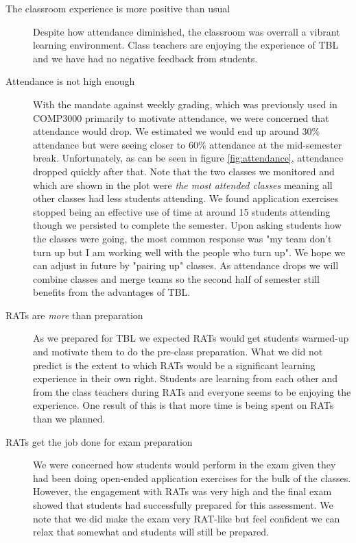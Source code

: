 \documentclass[twoside=false,DIV=14]{scrartcl}
\begin{document}
\begin{description}
\item[The classroom experience is more positive than usual] Despite how attendance diminished, the classroom was overrall a vibrant learning environment.  Class teachers are enjoying the experience of TBL and we have had no negative feedback from students.
\item[Attendance is not high enough]  With the mandate against weekly grading, which was previously used in COMP3000 primarily to motivate attendance, we were concerned that attendance would drop.  We estimated we would end up around 30\% attendance but were seeing closer to 60\% attendance at the mid-semester break. Unfortunately, as can be seen in figure \ref{fig:attendance}, attendance dropped quickly after that.  Note that the two classes we monitored and which are shown in the plot were \emph{the most attended classes} meaning all other classes had less students attending.  We found application exercises stopped being an effective use of time at around 15 students attending though we persisted to complete the semester.  Upon asking students how the classes were going, the most common response was "my team don't turn up but I am working well with the people who turn up".  We hope we can adjust in future by "pairing up" classes.  As attendance drops we will combine classes and merge teams so the second half of semester still benefits from the advantages of TBL.
\item[RATs are \emph{more} than preparation]  As we prepared for TBL we expected RATs would get students warmed-up and motivate them to do the pre-class preparation.  What we did not predict is the extent to which RATs would be a significant learning experience in their own right.  Students are learning from each other and from the class teachers during RATs and everyone seems to be enjoying the experience.  One result of this is that more time is being spent on RATs than we planned.
\item[RATs get the job done for exam preparation] We were concerned how students would perform in the exam given they had been doing open-ended application exercises for the bulk of the classes.  However, the engagement with RATs was very high and the final exam showed that students had successfully prepared for this assessment.  We note that we did make the exam very RAT-like but feel confident we can relax that somewhat and students will still be prepared.

\end{description}
\end{document}
